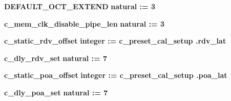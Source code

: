 \begin{DoxyCompactItemize}
{\bf D\+E\+F\+A\+U\+L\+T\+\_\+\+O\+C\+T\+\_\+\+E\+X\+T\+E\+ND} {\bfseries \textcolor{comment}{natural}\textcolor{vhdlchar}{ }\textcolor{vhdlchar}{ }\textcolor{vhdlchar}{\+:}\textcolor{vhdlchar}{=}\textcolor{vhdlchar}{ }\textcolor{vhdlchar}{ } \textcolor{vhdldigit}{3} \textcolor{vhdlchar}{ }} 
\item 
{\bf c\+\_\+mem\+\_\+clk\+\_\+disable\+\_\+pipe\+\_\+len} {\bfseries \textcolor{comment}{natural}\textcolor{vhdlchar}{ }\textcolor{vhdlchar}{ }\textcolor{vhdlchar}{\+:}\textcolor{vhdlchar}{=}\textcolor{vhdlchar}{ }\textcolor{vhdlchar}{ } \textcolor{vhdldigit}{3} \textcolor{vhdlchar}{ }} 
\item 
{\bf c\+\_\+static\+\_\+rdv\+\_\+offset} {\bfseries \textcolor{comment}{integer}\textcolor{vhdlchar}{ }\textcolor{vhdlchar}{ }\textcolor{vhdlchar}{\+:}\textcolor{vhdlchar}{=}\textcolor{vhdlchar}{ }\textcolor{vhdlchar}{ }\textcolor{vhdlchar}{ }\textcolor{vhdlchar}{ }{\bfseries {\bf c\+\_\+preset\+\_\+cal\+\_\+setup}} \textcolor{vhdlchar}{.}\textcolor{vhdlchar}{rdv\+\_\+lat}\textcolor{vhdlchar}{ }} 
\item 
{\bf c\+\_\+dly\+\_\+rdv\+\_\+set} {\bfseries \textcolor{comment}{natural}\textcolor{vhdlchar}{ }\textcolor{vhdlchar}{ }\textcolor{vhdlchar}{\+:}\textcolor{vhdlchar}{=}\textcolor{vhdlchar}{ }\textcolor{vhdlchar}{ } \textcolor{vhdldigit}{7} \textcolor{vhdlchar}{ }} 
\item 
{\bf c\+\_\+static\+\_\+poa\+\_\+offset} {\bfseries \textcolor{comment}{integer}\textcolor{vhdlchar}{ }\textcolor{vhdlchar}{ }\textcolor{vhdlchar}{\+:}\textcolor{vhdlchar}{=}\textcolor{vhdlchar}{ }\textcolor{vhdlchar}{ }\textcolor{vhdlchar}{ }\textcolor{vhdlchar}{ }{\bfseries {\bf c\+\_\+preset\+\_\+cal\+\_\+setup}} \textcolor{vhdlchar}{.}\textcolor{vhdlchar}{poa\+\_\+lat}\textcolor{vhdlchar}{ }} 
\item 
{\bf c\+\_\+dly\+\_\+poa\+\_\+set} {\bfseries \textcolor{comment}{natural}\textcolor{vhdlchar}{ }\textcolor{vhdlchar}{ }\textcolor{vhdlchar}{\+:}\textcolor{vhdlchar}{=}\textcolor{vhdlchar}{ }\textcolor{vhdlchar}{ } \textcolor{vhdldigit}{7} \textcolor{vhdlchar}{ }} 
\end{DoxyCompactItemize}
